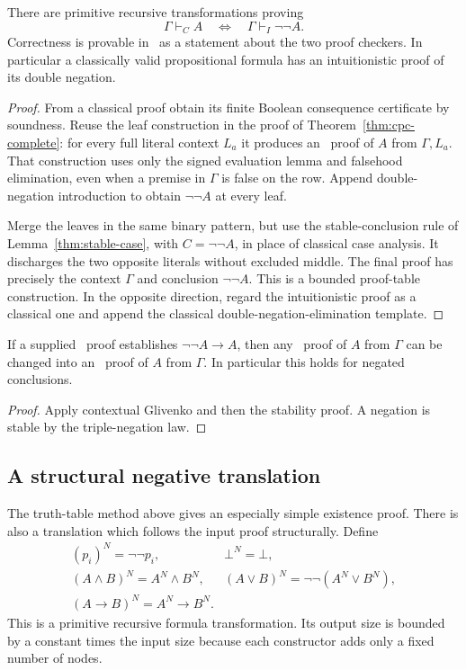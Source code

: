 \begin{theorem}\label{thm:glivenko}
There are primitive recursive transformations proving
\[
       \Gamma\vdash_C A
       \quad\Longleftrightarrow\quad
       \Gamma\vdash_I\neg\neg A.
\]
Correctness is provable in \ipra\ as a statement about the two proof
checkers. In particular a classically valid propositional formula has an
intuitionistic proof of its double negation.
\end{theorem}
\begin{proof}
From a classical proof obtain its finite Boolean consequence certificate
by soundness. Reuse the leaf construction in the proof of
Theorem~\ref{thm:cpc-complete}: for every full literal context $L_a$ it
produces an \IPC\ proof of $A$ from $\Gamma,L_a$. That construction uses
only the signed evaluation lemma and falsehood elimination, even when
a premise in $\Gamma$ is false on the row. Append double-negation
introduction to obtain $\neg\neg A$ at every leaf.

Merge the leaves in the same binary pattern, but use the stable-conclusion
rule of Lemma~\ref{thm:stable-case}, with $C=\neg\neg A$, in place of
classical case analysis. It discharges the two opposite literals without
excluded middle. The final proof has precisely the context $\Gamma$ and
conclusion $\neg\neg A$. This is a bounded proof-table construction.
In the opposite direction, regard the intuitionistic proof as a classical
one and append the classical double-negation-elimination template.
\end{proof}

\begin{corollary}\label{thm:stable-conservativity}
If a supplied \IPC\ proof establishes $\neg\neg A\to A$, then any
\CPC\ proof of $A$ from $\Gamma$ can be changed into an \IPC\ proof of
$A$ from $\Gamma$. In particular this holds for negated conclusions.
\end{corollary}
\begin{proof}
Apply contextual Glivenko and then the stability proof. A negation is
stable by the triple-negation law.
\end{proof}

\subsection{A structural negative translation}

The truth-table method above gives an especially simple existence proof.
There is also a translation which follows the input proof structurally.
Define
\[
\begin{array}{ll}
 (p_i)^N=\neg\neg p_i,&\bot^N=\bot,\\
 (A\wedge B)^N=A^N\wedge B^N,&
 (A\vee B)^N=\neg\neg(A^N\vee B^N),\\
 (A\to B)^N=A^N\to B^N.&
\end{array}
\]
This is a primitive recursive formula transformation. Its output size is
bounded by a constant times the input size because each constructor adds
only a fixed number of nodes.

